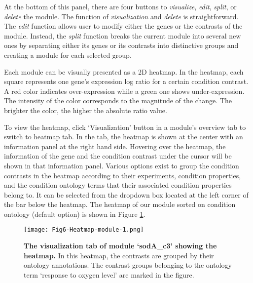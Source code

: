 \begin{adjustwidth}{5mm}{0cm}
At the bottom of this panel, there are four buttons to \textit{visualize}, 
\textit{edit}, \textit{split}, or \textit{delete} the module. The function of 
\textit{visualization} and \textit{delete} is straightforward. The 
\textit{edit} function allows user to modify either the genes or 
the contrasts of the module. Instead, the \textit{split} function breaks the 
current module into several new ones by separating either its genes or its 
contrasts into distinctive groups and creating a module for each selected group.
\end{adjustwidth}

\begin{adjustwidth}{5mm}{0cm}
	Each module can be visually presented as a 2D 
heatmap. 
In the heatmap, each square represents one gene's expression log ratio for a 
certain condition contrast. A red color indicates over-expression while a green 
one shows under-expression. The intensity of the color corresponds to the 
magnitude of the change. The brighter the color, the higher the absolute ratio 
value.
\end{adjustwidth}

\begin{adjustwidth}{5mm}{0cm}
To view the heatmap, click `Visualization' button in a module's overview tab to 
switch to heatmap tab. In the tab, the heatmap is shown at the center with an 
information panel at the right hand side. Hovering over the heatmap, the 
information of the gene and the condition contrast under the cursor will be 
shown in that information panel. Various options exist to group the condition 
contrasts in the heatmap according to their experiments, condition properties, 
and the condition ontology terms that their associated condition properties 
belong to. It can be selected from the dropdown box located at the left corner 
of the bar below the heatmap. The heatmap of our module sorted on condition 
ontology (default option) is shown in Figure \ref{fig:colombos-heatmap-m1}.
\end{adjustwidth}

\begin{figure}[tb]
	\centering
  	\texttt{[image: Fig6-Heatmap-module-1.png]}
	\caption[Heatmap of module `sodA\_c3']{\textbf{The visualization tab of 
	module `sodA\_c3' showing the heatmap.}
	In this heatmap, the contrasts are grouped by their ontology annotations. 
	The contrast groups belonging to the ontology term `response to oxygen 
	level' are marked in the figure.}
	\label{fig:colombos-heatmap-m1}
\end{figure}

